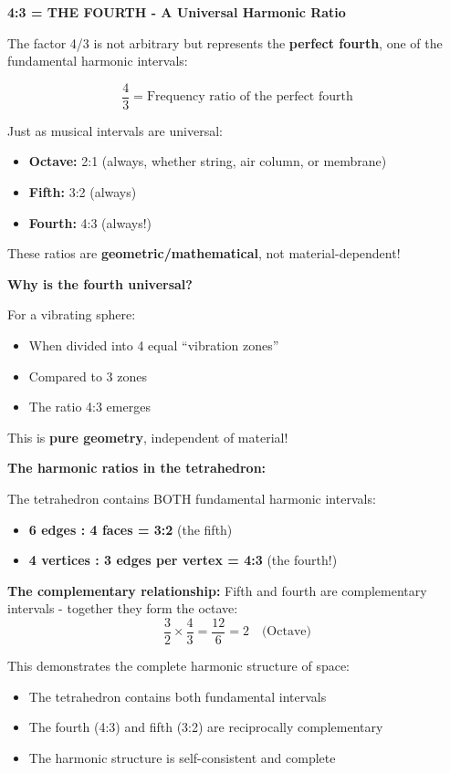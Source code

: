 \textbf{4:3 = THE FOURTH - A Universal Harmonic Ratio}

The factor 4/3 is not arbitrary but represents the \textbf{perfect fourth}, one of the fundamental harmonic intervals:

\begin{equation}
	\frac{4}{3} = \text{Frequency ratio of the perfect fourth}
\end{equation}

Just as musical intervals are universal:
\begin{itemize}
	\item \textbf{Octave:} 2:1 (always, whether string, air column, or membrane)
	\item \textbf{Fifth:} 3:2 (always)
	\item \textbf{Fourth:} 4:3 (always!)
\end{itemize}

These ratios are \textbf{geometric/mathematical}, not material-dependent!

\textbf{Why is the fourth universal?}

For a vibrating sphere:
\begin{itemize}
	\item When divided into 4 equal ``vibration zones''
	\item Compared to 3 zones
	\item The ratio 4:3 emerges
\end{itemize}

This is \textbf{pure geometry}, independent of material!

\textbf{The harmonic ratios in the tetrahedron:}

The tetrahedron contains BOTH fundamental harmonic intervals:
\begin{itemize}
	\item \textbf{6 edges : 4 faces = 3:2} (the fifth)
	\item \textbf{4 vertices : 3 edges per vertex = 4:3} (the fourth!)
\end{itemize}

\textbf{The complementary relationship:}
Fifth and fourth are complementary intervals - together they form the octave:
\begin{equation}
	\frac{3}{2} \times \frac{4}{3} = \frac{12}{6} = 2 \quad \text{(Octave)}
\end{equation}

This demonstrates the complete harmonic structure of space:
\begin{itemize}
	\item The tetrahedron contains both fundamental intervals
	\item The fourth (4:3) and fifth (3:2) are reciprocally complementary
	\item The harmonic structure is self-consistent and complete
\end{itemize}

